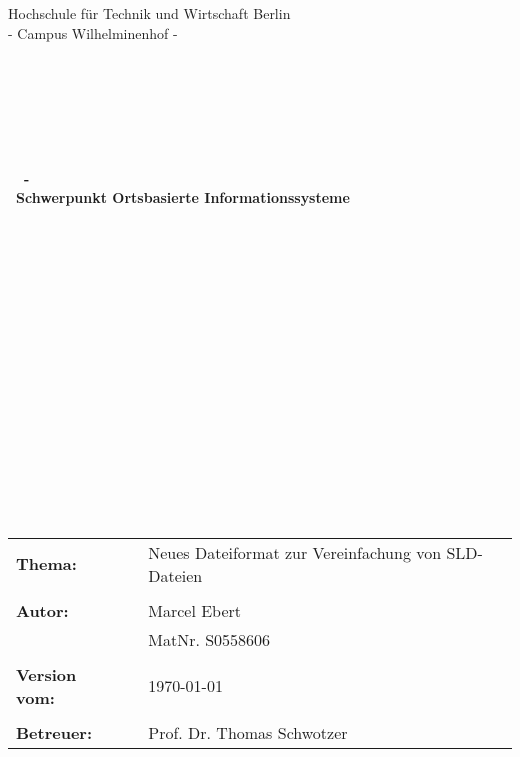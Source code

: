 \thispagestyle{empty}

\begin{center}
\Large{Hochschule für Technik und Wirtschaft Berlin}\\
\Large{- Campus Wilhelminenhof -}\\
\end{center}

\begin{verbatim}




\end{verbatim}
\begin{center}
\doublespacing
\textbf{\LARGE{\titleDocument}}\\
\singlespacing
\begin{verbatim}

\end{verbatim}
\textbf{{~\subjectDocument~-\\~Schwerpunkt Ortsbasierte Informationssysteme}}
\end{center}

\begin{verbatim}



















\end{verbatim}
\begin{flushleft}
\begin{tabular}{llll}
\textbf{Thema:} & & Neues Dateiformat zur Vereinfachung von SLD-Dateien & \\
& & \\
\textbf{Autor:} & & Marcel Ebert  \\
& & MatNr. S0558606 & \\
& & \\
\textbf{Version vom:} & & \today &\\
& & \\
\textbf{Betreuer:} & & Prof. Dr. Thomas Schwotzer &\\
\end{tabular}
\end{flushleft}